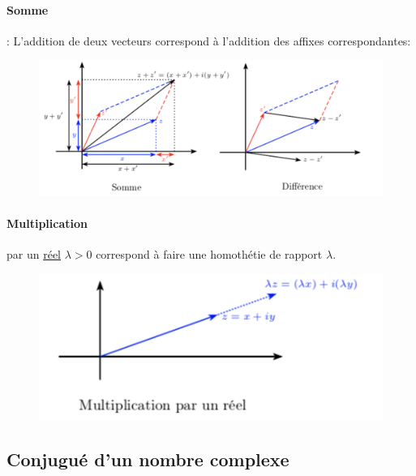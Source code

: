 \documentclass[a4paper, 11pt]{article}
\begin{document}
\newpage
\paragraph{Somme} : L'addition de deux vecteurs correspond à l'addition des affixes correspondantes: 
\begin{figure}[h]
\centering
\includegraphics[scale=0.4]{images/somme}
\end{figure}


\paragraph{Multiplication}  par un \underline{réel} $\lambda>0$ correspond à faire une homothétie de rapport $\lambda$. 
\begin{figure}[h]
\centering
\includegraphics[scale=0.4]{images/mult}
\vspace{-0.4cm}
\end{figure}

\subsection{Conjugué d'un nombre complexe}
\end{document}
